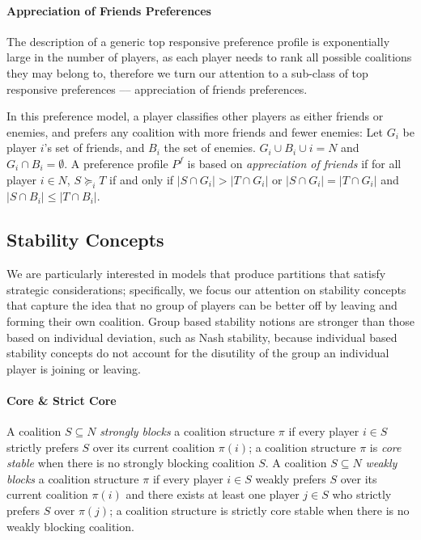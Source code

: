 \documentclass[letterpaper]{article} %
\theoremstyle{definition}
\begin{document}
\paragraph{Appreciation of Friends Preferences}
The description of a generic top responsive preference profile is exponentially large in the number of players, as each player needs to rank all possible coalitions they may belong to, therefore we turn our attention to a sub-class of top responsive preferences –-- appreciation of friends preferences.

In this preference model, a player classifies other players as either friends or enemies, and prefers any coalition with more friends and fewer enemies: Let $G_i$ be player $i$'s set of friends, and $B_i$ the set of enemies. $G_i \cup B_i \cup i = N$ and $G_i \cap B_i = \emptyset$. A preference profile $P^f$ is based on {\it appreciation of friends} if for all player $i \in N$, $S \succeq_i T$ if and only if $|S \cap G_i| > |T \cap G_i|$ or $|S \cap G_i| = |T \cap G_i|$ and $|S \cap B_i| \leq |T \cap B_i|$.

\subsection{Stability Concepts} \label{subsec:stability}
We are particularly interested in models that produce partitions that satisfy strategic considerations; specifically, we focus our attention on stability concepts that capture the idea that no group of players can be better off by leaving and forming their own coalition. Group based stability notions are stronger than those based on individual deviation, such as Nash stability, because individual based stability concepts do not account for the disutility of the group an individual player is joining or leaving.

\paragraph{Core \& Strict Core}
A coalition $S \subseteq N$ {\it strongly blocks} a coalition structure $\pi$ if every player $i \in S$ strictly prefers $S$ over its current coalition $\pi(i)$; a coalition structure $\pi$ is {\it core stable} when there is no strongly blocking coalition $S$. 
A coalition $S \subseteq N$ {\it weakly blocks} a coalition structure $\pi$ if every player $i \in S$ weakly prefers $S$ over its current coalition $\pi(i)$ and there exists at least one player $j \in S$ who strictly prefers $S$ over $\pi(j)$; a coalition structure is strictly core stable when there is no weakly blocking coalition.
\end{document}
